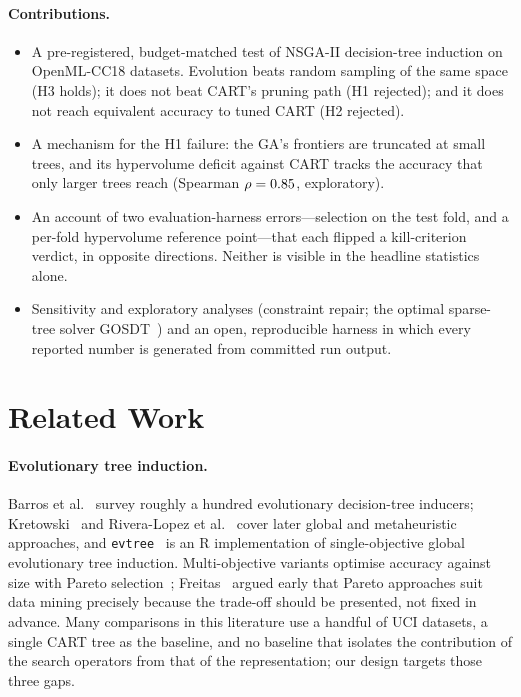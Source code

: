 \documentclass[sigconf,review,anonymous]{acmart}
\newcommand{\GA}{GA\xspace}
\begin{document}
\paragraph{Contributions.}
\begin{itemize}
\item A pre-registered, budget-matched test of NSGA-II decision-tree induction on
\NDatasets{} OpenML-CC18 datasets. Evolution beats random sampling of the same space
(H3 holds); it does not beat CART's pruning path (H1 rejected); and it does not reach
equivalent accuracy to tuned CART (H2 rejected).
\item A mechanism for the H1 failure: the \GA's frontiers are truncated at small trees,
and its hypervolume deficit against CART tracks the accuracy that only larger trees reach
(Spearman $\rho=0.85$, exploratory).
\item An account of two evaluation-harness errors---selection on the test fold, and a
per-fold hypervolume reference point---that each flipped a kill-criterion verdict, in
opposite directions. Neither is visible in the headline statistics alone.
\item Sensitivity and exploratory analyses (constraint repair; the optimal sparse-tree
solver GOSDT~\cite{lin2020}) and an open, reproducible harness in which every reported
number is generated from committed run output.
\end{itemize}

\section{Related Work}

\paragraph{Evolutionary tree induction.} Barros et al.~\cite{barros2012} survey roughly a
hundred evolutionary decision-tree inducers; Kretowski~\cite{kretowski2019} and Rivera-Lopez
et al.~\cite{rivera2022} cover later global and metaheuristic approaches, and
\texttt{evtree}~\cite{grubinger2014} is an R implementation of single-objective global
evolutionary tree induction.
Multi-objective variants optimise accuracy against size with Pareto
selection~\cite{zhao2007}; Freitas~\cite{freitas2004} argued early that Pareto approaches
suit data mining precisely because the trade-off should be presented, not fixed in
advance. Many comparisons in this literature use a handful of UCI datasets, a single CART tree
as the baseline, and no baseline that isolates the contribution of the search operators
from that of the representation; our design targets those three gaps.
\end{document}
